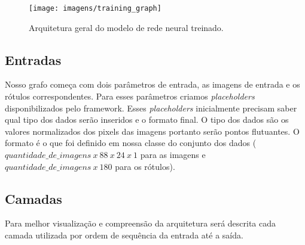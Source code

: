 \begin{figure}[H]
\centering
\texttt{[image: imagens/training\_graph]}
\caption{Arquitetura geral do modelo de rede neural treinado.}
\label{fig:gradient_descent}
\end{figure}

\subsection{Entradas}

Nosso grafo começa com dois parâmetros de entrada, as imagens de
entrada e os rótulos correspondentes. Para esses parâmetros criamos
\textit{placeholders} disponibilizados pelo framework. Esses
\textit{placeholders} inicialmente precisam saber qual tipo dos dados
serão inseridos e o formato final. O tipo dos dados são os valores
normalizados dos pixels das imagens portanto serão pontos
flutuantes. O formato é o que foi definido em nossa classe do conjunto
dos dados ($quantidade\_de\_imagens\ x\ 88\ x\ 24\ x\ 1$ para as
imagens e $quantidade\_de\_imagens\ x\ 180$ para os rótulos).

\subsection{Camadas}

Para melhor visualização e compreensão da arquitetura será descrita
cada camada utilizada por ordem de sequência da entrada até a saída.

